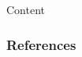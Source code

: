 \documentclass[10pt]{beamer}
\begin{document}
\begin{frame}[noframenumbering] 
  \titlepage 
\end{frame}


\begin{frame}{Content}{}
\tableofcontents
\end{frame}



\begin{frame}
    \frametitle{References}
    
    
\end{frame}
\end{document}
